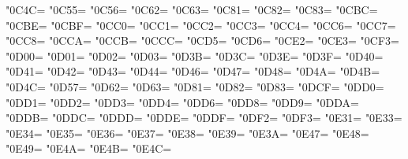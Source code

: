 \XeTeXcharclass"0C4C=\KclassCM
\XeTeXcharclass"0C55=\KclassCM
\XeTeXcharclass"0C56=\KclassCM
\XeTeXcharclass"0C62=\KclassCM
\XeTeXcharclass"0C63=\KclassCM
\XeTeXcharclass"0C81=\KclassCM
\XeTeXcharclass"0C82=\KclassCM
\XeTeXcharclass"0C83=\KclassCM
\XeTeXcharclass"0CBC=\KclassCM
\XeTeXcharclass"0CBE=\KclassCM
\XeTeXcharclass"0CBF=\KclassCM
\XeTeXcharclass"0CC0=\KclassCM
\XeTeXcharclass"0CC1=\KclassCM
\XeTeXcharclass"0CC2=\KclassCM
\XeTeXcharclass"0CC3=\KclassCM
\XeTeXcharclass"0CC4=\KclassCM
\XeTeXcharclass"0CC6=\KclassCM
\XeTeXcharclass"0CC7=\KclassCM
\XeTeXcharclass"0CC8=\KclassCM
\XeTeXcharclass"0CCA=\KclassCM
\XeTeXcharclass"0CCB=\KclassCM
\XeTeXcharclass"0CCC=\KclassCM
\XeTeXcharclass"0CD5=\KclassCM
\XeTeXcharclass"0CD6=\KclassCM
\XeTeXcharclass"0CE2=\KclassCM
\XeTeXcharclass"0CE3=\KclassCM
\XeTeXcharclass"0CF3=\KclassCM
\XeTeXcharclass"0D00=\KclassCM
\XeTeXcharclass"0D01=\KclassCM
\XeTeXcharclass"0D02=\KclassCM
\XeTeXcharclass"0D03=\KclassCM
\XeTeXcharclass"0D3B=\KclassCM
\XeTeXcharclass"0D3C=\KclassCM
\XeTeXcharclass"0D3E=\KclassCM
\XeTeXcharclass"0D3F=\KclassCM
\XeTeXcharclass"0D40=\KclassCM
\XeTeXcharclass"0D41=\KclassCM
\XeTeXcharclass"0D42=\KclassCM
\XeTeXcharclass"0D43=\KclassCM
\XeTeXcharclass"0D44=\KclassCM
\XeTeXcharclass"0D46=\KclassCM
\XeTeXcharclass"0D47=\KclassCM
\XeTeXcharclass"0D48=\KclassCM
\XeTeXcharclass"0D4A=\KclassCM
\XeTeXcharclass"0D4B=\KclassCM
\XeTeXcharclass"0D4C=\KclassCM
\XeTeXcharclass"0D57=\KclassCM
\XeTeXcharclass"0D62=\KclassCM
\XeTeXcharclass"0D63=\KclassCM
\XeTeXcharclass"0D81=\KclassCM
\XeTeXcharclass"0D82=\KclassCM
\XeTeXcharclass"0D83=\KclassCM
\XeTeXcharclass"0DCF=\KclassCM
\XeTeXcharclass"0DD0=\KclassCM
\XeTeXcharclass"0DD1=\KclassCM
\XeTeXcharclass"0DD2=\KclassCM
\XeTeXcharclass"0DD3=\KclassCM
\XeTeXcharclass"0DD4=\KclassCM
\XeTeXcharclass"0DD6=\KclassCM
\XeTeXcharclass"0DD8=\KclassCM
\XeTeXcharclass"0DD9=\KclassCM
\XeTeXcharclass"0DDA=\KclassCM
\XeTeXcharclass"0DDB=\KclassCM
\XeTeXcharclass"0DDC=\KclassCM
\XeTeXcharclass"0DDD=\KclassCM
\XeTeXcharclass"0DDE=\KclassCM
\XeTeXcharclass"0DDF=\KclassCM
\XeTeXcharclass"0DF2=\KclassCM
\XeTeXcharclass"0DF3=\KclassCM
\XeTeXcharclass"0E31=\KclassCM
\XeTeXcharclass"0E33=\KclassCM
\XeTeXcharclass"0E34=\KclassCM
\XeTeXcharclass"0E35=\KclassCM
\XeTeXcharclass"0E36=\KclassCM
\XeTeXcharclass"0E37=\KclassCM
\XeTeXcharclass"0E38=\KclassCM
\XeTeXcharclass"0E39=\KclassCM
\XeTeXcharclass"0E3A=\KclassCM
\XeTeXcharclass"0E47=\KclassCM
\XeTeXcharclass"0E48=\KclassCM
\XeTeXcharclass"0E49=\KclassCM
\XeTeXcharclass"0E4A=\KclassCM
\XeTeXcharclass"0E4B=\KclassCM
\XeTeXcharclass"0E4C=\KclassCM
